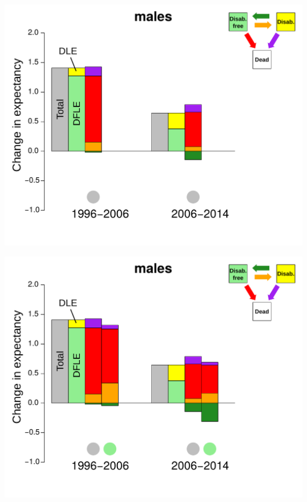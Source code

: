 \documentclass[20pt,usenames,dvipsnames]{beamer}
\begin{document}
\begin{frame}[plain]
\includegraphics[height=\textheight, keepaspectratio]{Figures/MalesDecAllEdu3.pdf}
\end{frame}
\begin{frame}[plain]
\includegraphics[height=\textheight, keepaspectratio]{Figures/MalesDecAllEdu4.pdf}
\end{frame}
\end{document}
